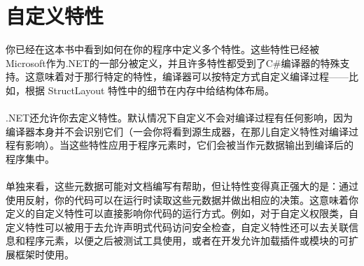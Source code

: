 \section{自定义特性}
你已经在这本书中看到如何在你的程序中定义多个特性。这些特性已经被Microsoft作为.NET的一部分被定义，并且许多特性都受到了C\#编译器的特殊支持。这意味着对于那行特定的特性，编译器可以按特定方式自定义编译过程——比如，根据 StructLayout 特性中的细节在内存中给结构体布局。
\\ \\
.NET还允许你去定义特性。默认情况下自定义不会对编译过程有任何影响，因为编译器本身并不会识别它们（一会你将看到源生成器，在那儿自定义特性对编译过程有影响）。当这些特性应用于程序元素时，它们会被当作元数据输出到编译后的程序集中。
\\ \\
单独来看，这些元数据可能对文档编写有帮助，但让特性变得真正强大的是：通过使用反射，你的代码可以在运行时读取这些元数据并做出相应的决策。这意味着你定义的自定义特性可以直接影响你代码的运行方式。例如，对于自定义权限类，自定义特性可以被用于去允许声明式代码访问安全检查，自定义特性还可以去关联信息和程序元素，以便之后被测试工具使用，或者在开发允许加载插件或模块的可扩展框架时使用。